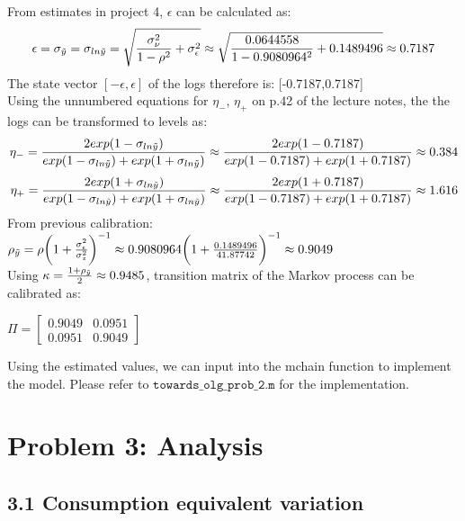 \documentclass[12pt,a4paper]{article}
\begin{document}
From estimates in project 4, $\epsilon$ can be calculated as:
\begin{equation*}
    \epsilon=\sigma_{\Tilde{y}}=\sigma_{ln \Tilde{y}}=\sqrt{\frac{\sigma^2_\nu}{1-\rho^2} +\sigma^2_\epsilon}\approx \sqrt{\frac{0.0644558}{1-0.9080964^2} +0.1489496}\approx 0.7187
\end{equation*}
The state vector $[-\epsilon,\epsilon]$ of the logs therefore is: [-0.7187,0.7187]\\
Using the unnumbered equations for $\eta_-$, $\eta_+$ on p.42 of the lecture notes, the the logs can be transformed to levels as: 
\begin{equation*}
    \eta_-=\frac{2exp(1-\sigma_{ln\Tilde{y}})}{exp(1-\sigma_{ln\Tilde{y}})+exp(1+\sigma_{ln\Tilde{y}})}\approx\frac{2exp(1-0.7187)}{exp(1-0.7187)+exp(1+0.7187)}\approx0.384
    \end{equation*}
    \begin{equation*}
       \eta_+=\frac{2exp(1+\sigma_{ln\Tilde{y}})}{exp(1-\sigma_{ln\Tilde{y}})+exp(1+\sigma_{ln\Tilde{y}})}\approx\frac{2exp(1+0.7187)}{exp(1-0.7187)+exp(1+0.7187)}\approx 1.616
    \end{equation*}
From previous calibration: $\rho_{\Tilde{y}}=\rho\bigg(1+\frac{\sigma^2_\epsilon}{\sigma^2_z}\bigg)^{-1}\approx0.9080964\bigg(1+\frac{0.1489496}{41.87742}\bigg)^{-1}\approx 0.9049 $\\
Using $\kappa=\frac{1+\rho_{\Tilde{y}}}{2}\approx 0.9485$, transition matrix of the Markov process can be calibrated as:\\
\begin{center}
$\Pi = \begin{bmatrix}
 0.9049 & 0.0951 \\
 0.0951 &  0.9049  
\end{bmatrix} $
\end{center}

Using the estimated values, we can input into the mchain function to implement the model. Please refer to $\texttt{towards\_olg\_prob\_2.m}$ for the implementation.

\section*{Problem 3: Analysis}

\subsection*{3.1 Consumption equivalent variation}
\end{document}

